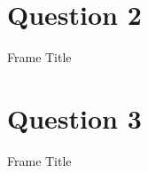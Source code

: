 \documentclass{beamer}
\begin{document}
\section{Question 2}
\begin{frame}{Frame Title}

\end{frame}


\section{Question 3}
\begin{frame}{Frame Title}
    
\end{frame}
\end{document}
